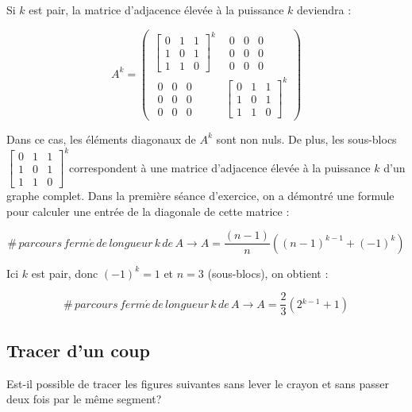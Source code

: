 \begin{solution}
Si $k$ est pair, la matrice d'adjacence élevée à la puissance $k$
deviendra :

\[
A^{k}=\left(\begin{array}{cc}
\left[\begin{array}{ccc}
0 & 1 & 1\\
1 & 0 & 1\\
1 & 1 & 0
\end{array}\right]^{k} & \begin{array}{ccc}
0 & 0 & 0\\
0 & 0 & 0\\
0 & 0 & 0
\end{array}\\
\begin{array}{ccc}
0 & 0 & 0\\
0 & 0 & 0\\
0 & 0 & 0
\end{array} & \left[\begin{array}{ccc}
0 & 1 & 1\\
1 & 0 & 1\\
1 & 1 & 0
\end{array}\right]^{k}
\end{array}\right)
\]


Dans ce cas, les éléments diagonaux de $A^{k}$ sont non nuls. De
plus, les sous-blocs $\left[\begin{array}{ccc}
0 & 1 & 1\\
1 & 0 & 1\\
1 & 1 & 0
\end{array}\right]^{k}$correspondent à une matrice d'adjacence élevée à la puissance $k$
d'un graphe complet. Dans la première séance d'exercice, on a démontré
une formule pour calculer une entrée de la diagonale de cette matrice
: 

\[
\#\, parcours\, ferm\acute{e}\, de\, longueur\, k\, de\, A\rightarrow A=\frac{(n-1)}{n}((n-1)^{k-1}+(-1)^{k})
\]


Ici $k$ est pair, donc $(-1)^{k}=1$ et $n=3$ (sous-blocs), on obtient
:

\[
\#\, parcours\, ferm\acute{e}\, de\, longueur\, k\, de\, A\rightarrow A=\frac{2}{3}(2{}^{k-1}+1)
\]
\end{solution}

\subsection{Tracer d'un coup} Est-il possible de tracer les figures suivantes sans lever le crayon et sans passer deux fois par le même segment?

